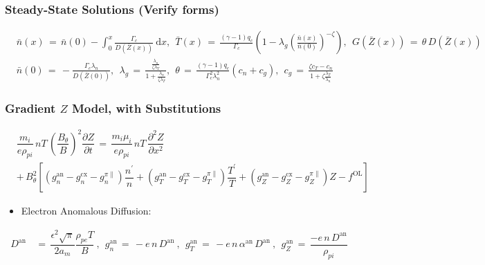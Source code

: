 \documentclass[a4paper,8pt]{article}
\providecommand{\tightlist}{%
  \setlength{\itemsep}{0pt}\setlength{\parskip}{0pt}}
\begin{document}
\hypertarget{steady-state-solutions-verify-forms}{%
\subsubsection{Steady-State Solutions (Verify
forms)}\label{steady-state-solutions-verify-forms}}

\small\begin{align}
    &\bar{n}(x) \,=\, \bar{n}(0) - \int_0^x \frac{\Gamma_c}{D(\bar{Z}(x))}~\text{d}x, ~~ \bar{T}(x) \,=\, \frac{(\gamma - 1) q_c}{\Gamma_c} \left(1 - \lambda_g\left(\frac{\bar{n}(x)}{\bar{n}(0)}\right)^{-\zeta}\right), ~~ G(\bar{Z}(x)) \,=\, \theta\,D(\bar{Z}(x)) \\
    &\bar{n}(0) \,=\, -\frac{\Gamma_c \lambda_n}{D(\bar{Z}(0))}, ~~ \lambda_g \,=\, \frac{\frac{\lambda_n}{\zeta \lambda_T}}{1 + \frac{\lambda_n}{\zeta \lambda_T}}, ~~ \theta \,=\, \frac{(\gamma - 1) q_c}{\Gamma_c^2 \lambda_n^2} (c_n + c_g), ~~ c_g \,=\, \frac{\zeta c_T - c_n}{1 + \zeta \frac{\lambda_T}{\lambda_n}}
\end{align}\normalsize

\hypertarget{gradient-z-model-with-substitutions}{%
\subsubsection{\texorpdfstring{Gradient \(Z\) Model, with
Substitutions}{Gradient Z Model, with Substitutions}}\label{gradient-z-model-with-substitutions}}

\begin{align}
    &\dfrac{m_i}{e \rho_{pi}} \,n T\, \left(\dfrac{B_\theta}{B}\right)^2 \dfrac{\partial Z}{\partial t} \,=\, \dfrac{m_i \mu_i}{e \rho_{pi}} \,n T\, \dfrac{\partial^2 Z}{\partial x^2} \\
    &+\, B_\theta^2 \left[\left(g_n^\text{an} - g_n^\text{cx} - g_n^{\pi\parallel}\right) \dfrac{n^\prime}{n} + \left(g_T^\text{an} - g_T^\text{cx} - g_T^{\pi\parallel}\right) \dfrac{T^\prime}{T} + \left(g_Z^\text{an} - g_Z^\text{cx} - g_Z^{\pi\parallel}\right) Z - f^\text{OL}\right]
\end{align}

\begin{itemize}
\tightlist
\item
  Electron Anomalous Diffusion:
\end{itemize}

\begin{align}
    D^\text{an} \,&=\, \dfrac{\epsilon^2 \sqrt{\pi}}{2 a_m} \dfrac{\rho_{pe} T}{B}~,~~ g_n^\text{an} \,=\, -e \,n\, D^\text{an}~,~~ g_T^\text{an} \,=\, -e \,n\, \alpha^\text{an}\, D^\text{an}~,~~ g_Z^\text{an} \,=\, \dfrac{-e \,n\, D^\text{an}}{\rho_{pi}}
\end{align}
\end{document}
